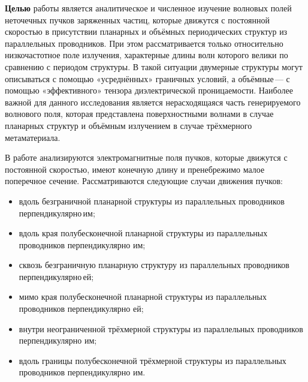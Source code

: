 \textbf{Целью} работы является аналитическое и численное изучение волновых полей неточечных пучков заряженных частиц, которые движутся с постоянной скоростью в присутствии планарных и объёмных периодических структур из параллельных проводников. При этом рассматривается только относительно низкочастотное поле излучения, характерные длины волн которого велики по сравнению с периодом структуры. В такой ситуации двумерные структуры могут описываться с помощью «усреднённых» граничных условий, а объёмные — с помощью «эффективного» тензора диэлектрической проницаемости. Наиболее важной для данного исследования является нерасходящаяся часть генерируемого волнового поля, которая представлена поверхностными волнами в случае планарных структур и объёмным излучением в случае трёхмерного метаматериала.  

В работе анализируются электромагнитные поля пучков, которые движутся с постоянной скоростью, имеют конечную длину и пренебрежимо малое поперечное сечение. Рассматриваются следующие случаи движения пучков: 
\begin{itemize}
\item вдоль безграничной планарной структуры из параллельных проводников перпендикулярно им;  
\item вдоль края полубесконечной планарной структуры из параллельных проводников перпендикулярно им;  
\item сквозь безграничную планарную структуру из параллельных проводников перпендикулярно ей;  
\item мимо края полубесконечной планарной структуры из параллельных проводников перпендикулярно ей;  
\item внутри неограниченной трёхмерной структуры из параллельных проводников перпендикулярно им;  
\item вдоль границы полубесконечной трёхмерной структуры из параллельных проводников перпендикулярно им.
\end{itemize}